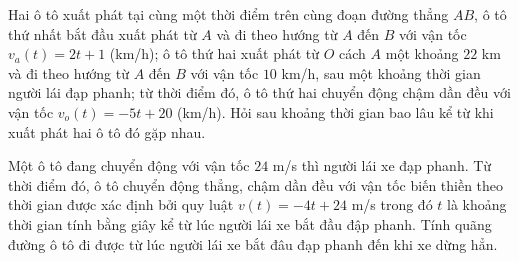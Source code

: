 \begin{ex}%
	Hai ô tô xuất phát tại cùng một thời điểm trên cùng đoạn đường thẳng $A B$, ô tô thứ nhất bắt đầu xuất phát từ $A$ và đi theo hướng từ $A$ đến $B$ với vận tốc $v_a(t)=2 t+1$ (km/h); ô tô thứ hai xuất phát từ $O$ cách $A$ một khoảng $22$ km và đi theo hướng từ $A$ đến $B$ với vận tốc $10$ km/h, sau một khoảng thời gian người lái đạp phanh; từ thời điểm đó, ô tô thứ hai chuyển động chậm dần đều với vận tốc $v_o(t)=-5 t+20$ (km/h). Hỏi sau khoảng thời gian bao lâu kể từ khi xuất phát hai ô tô đó gặp nhau.
\end{ex}

\begin{ex}%
	Một ô tô đang chuyển động với vận tốc $24$ m/s thì người lái xe đạp phanh. Từ thời điểm đó, ô tô chuyển động thẳng, chậm dần đều với vận tốc biến thiền theo thời gian được xác định bởi quy luật $v(t)=-4t+24$ m/s trong đó $t$ là khoảng thời gian tính bằng giây kể từ lúc người lái xe bắt đầu đập phanh. Tính quãng đường ô tô đi được từ lúc người lái xe bắt đâu đạp phanh đến khi xe dừng hẳn.
\end{ex}

